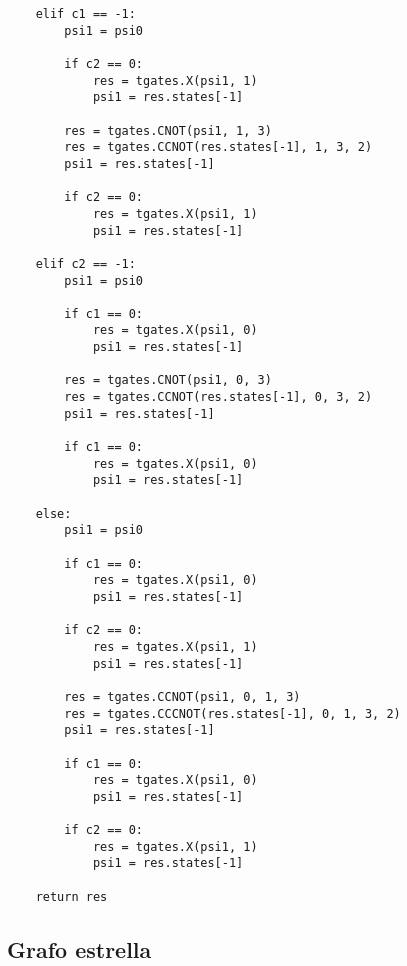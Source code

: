 \begin{verbatim}
    elif c1 == -1:
        psi1 = psi0

        if c2 == 0:
            res = tgates.X(psi1, 1)
            psi1 = res.states[-1]

        res = tgates.CNOT(psi1, 1, 3)
        res = tgates.CCNOT(res.states[-1], 1, 3, 2)
        psi1 = res.states[-1]

        if c2 == 0:
            res = tgates.X(psi1, 1)
            psi1 = res.states[-1]

    elif c2 == -1:
        psi1 = psi0

        if c1 == 0:
            res = tgates.X(psi1, 0)
            psi1 = res.states[-1]

        res = tgates.CNOT(psi1, 0, 3)
        res = tgates.CCNOT(res.states[-1], 0, 3, 2)
        psi1 = res.states[-1]

        if c1 == 0:
            res = tgates.X(psi1, 0)
            psi1 = res.states[-1]

    else:
        psi1 = psi0

        if c1 == 0:
            res = tgates.X(psi1, 0)
            psi1 = res.states[-1]

        if c2 == 0:
            res = tgates.X(psi1, 1)
            psi1 = res.states[-1]

        res = tgates.CCNOT(psi1, 0, 1, 3)
        res = tgates.CCCNOT(res.states[-1], 0, 1, 3, 2)
        psi1 = res.states[-1]

        if c1 == 0:
            res = tgates.X(psi1, 0)
            psi1 = res.states[-1]

        if c2 == 0:
            res = tgates.X(psi1, 1)
            psi1 = res.states[-1]

    return res

\end{verbatim}

\subsection{Grafo estrella}


